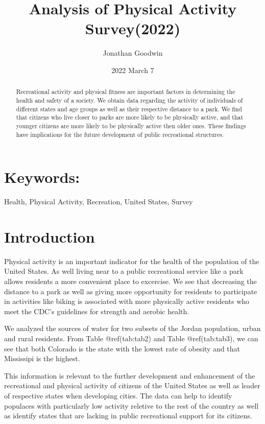 \documentclass[
]{article}
\title{Analysis of Physical Activity Survey(2022)}
\author{Jonathan Goodwin}
\date{2022 March 7}
\begin{document}
\maketitle
\begin{abstract}
Recreational activity and physical fitness are important factors in
determining the health and safety of a society. We obtain data regarding
the activity of individuals of different states and age groups as well
as their respective distance to a park. We find that citizens who live
closer to parks are more likely to be physically active, and that
younger citizens are more likely to be physically active then older
ones. These findings have implications for the future development of
public recreational structures.
\end{abstract}

\hypertarget{keywords}{%
\section{Keywords:}\label{keywords}}

Health, Physical Activity, Recreation, United States, Survey

\hypertarget{Intro}{%
\section{Introduction}\label{Intro}}

Physical activity is an important indicator for the health of the
population of the United States. As well living near to a public
recreational service like a park allows residents a more convenient
place to excercise. We see that decreasing the distance to a park as
well as giving more opportunity for residents to participate in
activities like biking is associated with more physically active
residents who meet the CDC's guidelines for strength and aerobic health.

We analyzed the sources of water for two subsets of the Jordan
population, urban and rural residents. From Table @ref(tab:tab2) and
Table @ref(tab:tab3), we can see that both Colorado is the state with
the lowest rate of obesity and that Mississipi is the highest.

This information is relevant to the further development and enhancement
of the recreational and physical activity of citizens of the United
States as well as leader of respective states when developing cities.
The data can help to identify populaces with particularly low activity
reletive to the rest of the country as well as identify states that are
lacking in public recreational support for its citizens.
\end{document}
